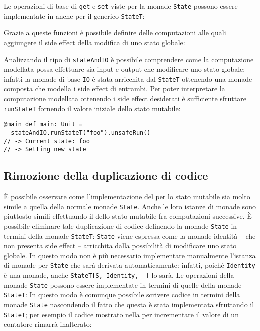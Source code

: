 Le operazioni di base di \lstinline{get} e \lstinline{set} viste per la monade \lstinline{State} possono essere implementate in anche per il generico \lstinline{StateT}:

Grazie a queste funzioni è possibile definire delle computazioni alle quali aggiungere il side effect della modifica di uno stato globale:

Analizzando il tipo di \lstinline{stateAndIO} è possibile comprendere come la computazione modellata possa effettuare sia input e output che modificare uno stato globale: infatti la monade di base \lstinline{IO} è stata arricchita dal  \lstinline{StateT} ottenendo una monade composta che modella i side effect di entrambi.
Per poter interpretare la computazione modellata ottenendo i side effect desiderati è sufficiente sfruttare \lstinline{runStateT} fornendo il valore iniziale dello stato mutabile:
\begin{lstlisting}[language=scala3]
@main def main: Unit =
  stateAndIO.runStateT("foo").unsafeRun()
// -> Current state: foo
// -> Setting new state
\end{lstlisting}

\subsection{Rimozione della duplicazione di codice}
È possibile osservare come l'implementazione del  per lo stato mutabile sia molto simile a quella della normale monade \lstinline{State}. Anche le loro istanze di monade sono piuttosto simili effettuando il  dello stato mutabile fra computazioni successive. È possibile eliminare tale duplicazione di codice definendo la monade \lstinline{State} in termini della monade \lstinline{StateT}:
\lstinline{State} viene espressa come la monade identità -- che non presenta side effect -- arricchita dalla possibilità di modificare uno stato globale. In questo modo non è più necessario implementare manualmente l'istanza di monade per \lstinline{State} che sarà derivata automaticamente: infatti, poiché \lstinline{Identity} è una monade, anche \lstinline{StateT[S, Identity, _]} lo sarà.
Le operazioni della monade \lstinline{State} possono essere implementate in termini di quelle della monade \lstinline{StateT}:
In questo modo è comunque possibile scrivere codice in termini della monade \lstinline{State} nascondendo il fatto che questa è stata implementata sfruttando il  \lstinline{StateT}; per esempio il codice mostrato nella  per incrementare il valore di un contatore rimarrà inalterato:
